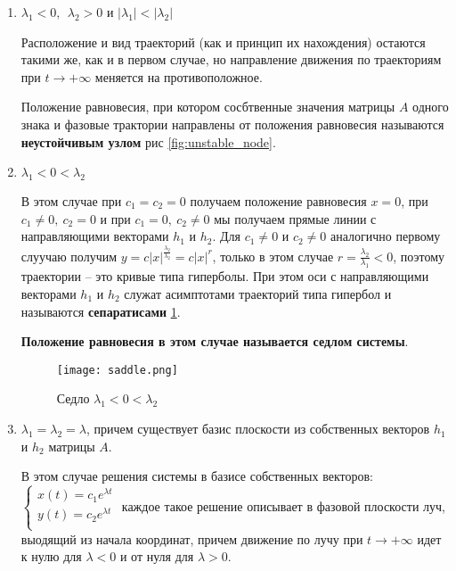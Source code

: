 \documentclass[a4paper, 12pt]{article}
\begin{document}
\begin{enumerate}
\begin{enumerate}
        \item $\lambda_1 < 0, ~~ \lambda_2 > 0$ и $|\lambda_1| < |\lambda_2|$
        
        Расположение и вид траекторий (как и принцип их нахождения) остаются такими же, как и в первом случае, но направление движения по траекториям при $t \rightarrow + \infty$ меняется на противоположное.

        \begin{definition}
          Положение равновесия, при котором сосбтвенные значения матрицы $A$ одного знака и фазовые трактории направлены от положения равновесия называются \textbf{неустойчивым узлом} рис \ref{fig:unstable_node}.
        \end{definition}

        \item $\lambda_1 < 0 < \lambda_2$
        
        В этом случае при $c_1 = c_2 = 0$ получаем положение равновесия $x = 0$, при $c_1 \neq 0, ~ c_2 = 0$ и при $c_1 = 0, ~ c_2 \neq 0$ мы получаем прямые линии с направляющими векторами $h_1$ и $h_2$. Для $c_1 \neq 0$ и $c_2 \neq 0$ аналогично первому слуучаю получим $\displaystyle y = c |x|^{\frac{\lambda_2}{\lambda_2}} = c |x|^r$, только в этом случае $\displaystyle r = \frac{\lambda_2}{\lambda_1} < 0$, поэтому траектории -- это кривые типа гиперболы. При этом оси с направляющими векторами $h_1$ и $h_2$ служат асимптотами траекторий типа гипербол и называются \textbf{сепаратисами} \ref{fig:saddle}.

        \textbf{Положение равновесия в этом случае называется седлом системы}.

        \begin{figure}[h!]
          \centering
          \texttt{[image: saddle.png]}
          \caption{Седло $\lambda_1 < 0 < \lambda_2$}
          \label{fig:saddle}
        \end{figure}

        \item $\lambda_1 = \lambda_2 = \lambda$, причем существует базис плоскости из собственных векторов $h_1$ и $h_2$ матрицы $A$.
        
        В этом случае решения системы в базисе собственных векторов:
        $\begin{cases}
          x(t) = c_1 e^{\lambda t} \\
          y(t) = c_2 e^{\lambda t} \\
        \end{cases}$
        каждое такое решение описывает в фазовой плоскости луч, выодящий из начала координат, причем движение по лучу при $t \rightarrow + \infty$ идет к нулю для $\lambda < 0$ и от нуля для $\lambda > 0$.


\end{enumerate}
\end{enumerate}
\end{document}
